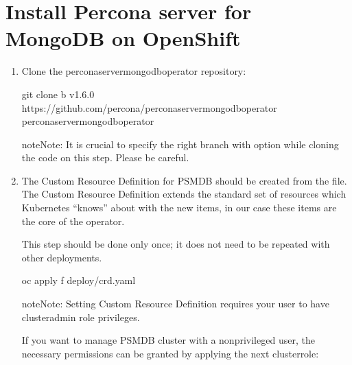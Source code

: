 \documentclass[letterpaper,10pt,english]{sphinxmanual}
\begin{document}
\chapter{Install Percona server for MongoDB on OpenShift}
\label{\detokenize{openshift:install-percona-server-for-mongodb-on-openshift}}\label{\detokenize{openshift::doc}}\begin{enumerate}
%
\setcounter{enumi}{-1}
\item {} 
Clone the percona\sphinxhyphen{}server\sphinxhyphen{}mongodb\sphinxhyphen{}operator repository:

\begin{sphinxVerbatim}[commandchars=\\\{\}]
git clone \PYGZhy{}b v1.6.0 https://github.com/percona/percona\PYGZhy{}server\PYGZhy{}mongodb\PYGZhy{}operator
 percona\PYGZhy{}server\PYGZhy{}mongodb\PYGZhy{}operator
\end{sphinxVerbatim}

\begin{sphinxadmonition}{note}{Note:}
It is crucial to specify the right branch with 
option while cloning the code on this step. Please be careful.
\end{sphinxadmonition}

\item {} 
The Custom Resource Definition for PSMDB should be created from the
 file. The Custom Resource Definition extends the
standard set of resources which Kubernetes “knows” about with the new
items, in our case these items are the core of the operator.

This step should be done only once; it does not need to be repeated with other deployments.

\begin{sphinxVerbatim}[commandchars=\\\{\}]
\PYGZdl{} oc apply \PYGZhy{}f deploy/crd.yaml
\end{sphinxVerbatim}

\begin{sphinxadmonition}{note}{Note:}
Setting Custom Resource Definition requires your user to
have cluster\sphinxhyphen{}admin role privileges.
\end{sphinxadmonition}

If you want to manage PSMDB cluster with a non\sphinxhyphen{}privileged user, the
necessary permissions can be granted by applying the next clusterrole:


\end{enumerate}
\end{document}
